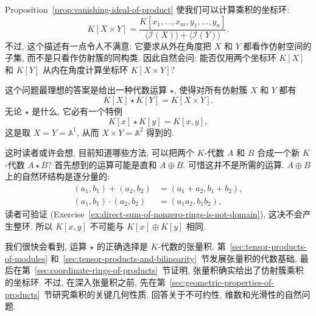 Proposition~\ref{prop:vanishing-ideal-of-product} 使我们可以计算乘积的坐标环:
\[
  K[X\times Y]=\frac{K[x_{1},\ldots,x_{m},y_{1},\ldots,y_{n}]}
    {\langle\mathcal{I}(X)\rangle+\langle\mathcal{I}(Y)\rangle}.
\]
不过, 这个描述有一点令人不满意: 它要求从外在角度把 $X$ 和 $Y$ 都看作仿射空间的子集, 而不是只看作仿射簇的同构类. 因此自然会问: 能否仅用两个坐标环 $K[X]$ 和 $K[Y]$ 从内在角度计算坐标环 $K[X\times Y]$?

这个问题最理想的答案是给出一种代数运算 $\star$, 使得对所有仿射簇 $X$ 和 $Y$ 都有
\[
  K[X]\star K[Y]=K[X\times Y].
\]
无论 $\star$ 是什么, 它必有一个特例
\[
  K[x]\star K[y]=K[x,y],
\]
这是取 $X=Y=\mathbb{A}^{1}$, 从而 $X\times Y=\mathbb{A}^{2}$ 得到的.

这时读者或许会想, 目前知道哪些方法, 可以把两个 $K$-代数 $A$ 和 $B$ 合成一个新 $K$-代数 $A\star B$? 首先想到的运算可能是直和 $A\oplus B$. 可惜这并不是所需的运算. $A\oplus B$ 上的自然环结构是逐分量的:
\[
  \begin{aligned}
    (a_{1},b_{1})+(a_{2},b_{2})&=(a_{1}+a_{2},b_{1}+b_{2}),\\
    (a_{1},b_{1})\cdot(a_{2},b_{2})&=(a_{1}a_{2},b_{1}b_{2}),
  \end{aligned}
\]
读者可验证 (Exercise~\ref{ex:direct-sum-of-nonzero-rings-is-not-domain}), 这决不会产生整环. 所以 $K[x,y]$ 不可能与 $K[x]\oplus K[y]$ 相同.

我们很快会看到, 运算 $\star$ 的正确选择是 $K$-代数的张量积. 第~\ref{sec:tensor-products-of-modules} 和~\ref{sec:tensor-products-and-bilinearity}~节发展张量积的代数基础, 最后在第~\ref{sec:coordinate-rings-of-products}~节证明, 张量积确实给出了仿射簇乘积的坐标环. 不过, 在深入张量积之前, 先在第~\ref{sec:geometric-properties-of-products}~节研究乘积的关键几何性质, 回答关于不可约性, 维数和光滑性的自然问题.

